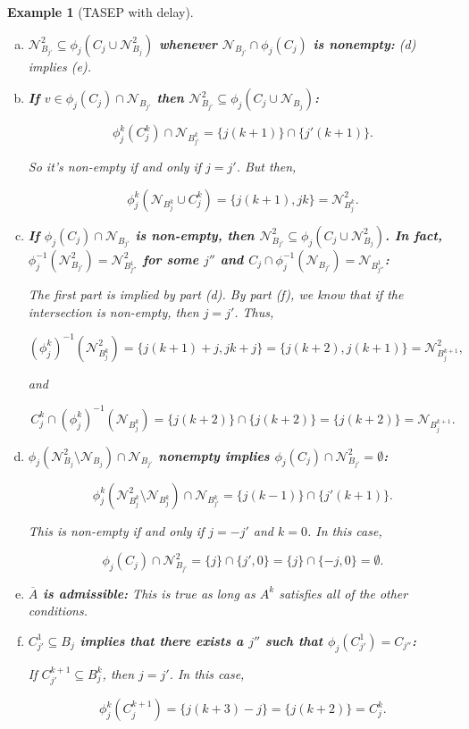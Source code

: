\documentclass[12pt]{article}
\newcommand{\mc}{\mathcal}
\newcommand{\ov}{\overline}
\newcommand{\neigh}[1]{\mc{N}_{#1}}				%
\newcommand{\dneigh}[1]{\mc{N}^2_{#1}}			%
\newcommand{\indx}[1]{^{#1}}						%
\newtheorem{example}[thms]{Example}
\begin{document}
\begin{example}[TASEP with delay]
\begin{description}
\begin{enumerate}[(a)]
\item {\bfseries\boldmath\(\dneigh{B_{j'}}\subseteq\phi_j(C_j\cup\dneigh{B_j})\) whenever \(\neigh{B_{j'}}\cap\phi_j(C_j)\) is nonempty:} (d) implies (e).

\item {\bfseries\boldmath If \(v\in \phi_j(C_j)\cap\neigh{B_{j'}}\) then \(\dneigh{B_{j'}}\subseteq \phi_j(C_j\cup\neigh{B_j})\):}

\[\phi\indx{k}_j(C\indx{k}_j)\cap\neigh{B\indx{k}_{j'}} = \{j(k+1)\}\cap\{j'(k+1)\}.\]

So it's non-empty if and only if \(j = j'\). But then,

\[\phi\indx{k}_j(\neigh{B\indx{k}_j}\cup C\indx{k}_j) = \{j(k+1),jk\} = \dneigh{B\indx{k}_j}.\]


\item {\bfseries\boldmath If \(\phi_j(C_j)\cap\neigh{B_{j'}}\) is non-empty, then \(\dneigh{B_{j'}} \subseteq \phi_j(C_j\cup\dneigh{B_j})\). In fact, \(\phi_j^{-1}(\dneigh{B_{j'}}) = \dneigh{B\indx{1}_{j''}}\) for some \(j''\) and \(C_j\cap\phi_j^{-1}(\neigh{B_{j'}}) = \neigh{B\indx{1}_{j''}}\):}

The first part is implied by part (d). By part (f), we know that if the intersection is non-empty, then \(j = j'\). Thus,

\[(\phi\indx{k}_j)^{-1}(\dneigh{B\indx{k}_j}) = \{j(k+1)+j,jk+j\} = \{j(k+2),j(k+1)\} = \dneigh{B\indx{k+1}_j},\]

and

\[C\indx{k}_j\cap(\phi\indx{k}_j)^{-1}(\neigh{B\indx{k}_j}) = \{j(k+2)\}\cap\{j(k+2)\} = \{j(k+2)\} = \neigh{B\indx{k+1}_j}.\]

\item {\bfseries\boldmath \(\phi_j(\dneigh{B_j}\setminus \neigh{B_j})\cap \neigh{B_{j'}}\) nonempty implies \(\phi_j(C_j)\cap\dneigh{B_{j'}} = \emptyset\):}

\[\phi\indx{k}_j(\dneigh{B\indx{k}_j}\setminus\neigh{B\indx{k}_j})\cap\neigh{B\indx{k}_{j'}} = \{j(k-1)\}\cap \{j'(k+1)\}.\]

This is non-empty if and only if \(j = -j'\) and \(k = 0\). In this case,

\[\phi_j(C_j) \cap \dneigh{B_{j'}} = \{j\}\cap\{j',0\} = \{j\}\cap\{-j,0\} = \emptyset.\]

\item {\bfseries\boldmath \(\ov{A}\) is admissible:} This is true as long as \(A\indx{k}\) satisfies all of the other conditions.

\item {\bfseries\boldmath \(C\indx{1}_{j'} \subseteq B_j\) implies that there exists a \(j''\) such that \(\phi_j(C\indx{1}_{j'}) = C_{j''}\):} 

If \(C\indx{k+1}_{j'} \subseteq B\indx{k}_j\), then \(j = j'\). In this case,

\[\phi\indx{k}_j(C\indx{k+1}_j) = \{j(k+3) - j\} = \{j(k+2)\} = C\indx{k}_j.\]

\end{enumerate}
\end{description}
\end{example}
\end{document}
